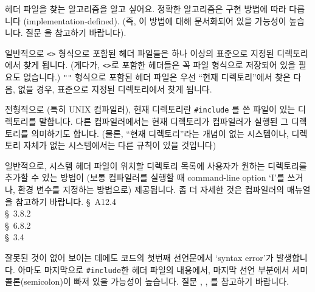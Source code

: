 \begin{faq}
	헤더 파일을 찾는 알고리즘을 알고 싶어요.
\A
	정확한 알고리즘은 구현 방법에 따라 다릅니다 (implementation-defined).
	(즉, 이 방법에 대해 문서화되어 있을 가능성이 높습니다.  질문 을
	참고하기 바랍니다).

	일반적으로 \verb+<>+ 형식으로 포함된 헤더 파일들은 하나 이상의
	표준으로 지정된 디렉토리에서 찾게 됩니다. (게다가,
          \verb+<>+로 포함한 헤더들은 꼭 파일 형식으로 저장되어 있을 필요도
          없습니다.) \verb+""+ 형식으로 포함된
	헤더 파일은 우선 ``현재 디렉토리''에서 찾은 다음, 없을 경우,
	표준으로 지정된 디렉토리에서 찾게 됩니다.

	전형적으로 (특히 UNIX 컴파일러), 현재 디렉토리란 \verb+#include+
	를 쓴 파일이 있는 디렉토리를 말합니다.  다른 컴파일러에서는
	현재 디렉토리가 컴파일러가 실행된 그 디렉토리를 의미하기도 합니다.
        (물론, ``현재 디렉토리''라는 개념이 없는 시스템이나, 디렉토리 자체가
        없는 시스템에서는 다른 규칙이 있을 것입니다)

        일반적으로, 시스템 헤더 파일이 위치할 디렉토리 목록에 사용자가
        원하는 디렉토리를 추가할 수 있는 방법이 (보통 컴파일러를 실행할 때
        command-line option `I'를 쓰거나, 환경 변수를 지정하는 방법으로)
        제공됩니다. 좀 더 자세한 것은 컴파일러의 매뉴얼을 참고하기 바랍니다.
\R
	\cite{kr2} \S\ A12.4  \\
        \cite{ansi} \S\ 3.8.2 \\
	\cite{c89} \S\ 6.8.2 \\
	\cite{hs} \S\ 3.4 
\end{faq}

\begin{faq} 
	잘못된 것이 없어 보이는 데에도 코드의 첫번째 선언문에서
	`syntax error'가 발생합니다.
\A
	아마도 마지막으로 \verb+#include+한 헤더 파일의 내용에서,
	마지막 선언 부분에서
	세미콜론(semicolon)이 빠져 있을 가능성이 높습니다.
	질문 , , 를 참고하기 바랍니다.
\end{faq}

